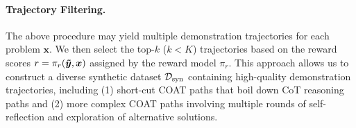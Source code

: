 \paragraph{Trajectory Filtering.}
The above procedure may yield multiple demonstration trajectories for each problem $\boldsymbol{x}$. We then select the top-$k$ ($k<K$) trajectories based on the reward scores $r = \pi_r(\boldsymbol{\Tilde{y}}, \boldsymbol{x})$ assigned by the reward model $\pi_r$. This approach allows us to construct a diverse synthetic dataset $\mathcal{D}_{\text{syn}}$ containing high-quality demonstration trajectories, including (1) short-cut COAT paths that boil down CoT reasoning paths and (2) more complex COAT paths involving multiple rounds of self-reflection and exploration of alternative solutions.